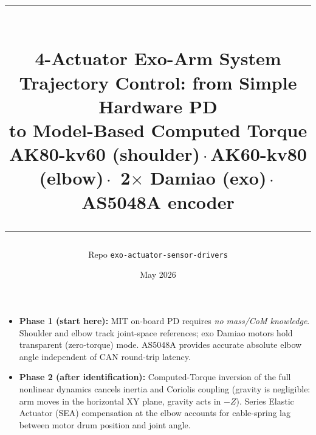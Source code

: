\documentclass[11pt,a4paper]{article}
\title{%
  \textcolor{hwblue}{\rule{\linewidth}{1.5pt}}\\[0.4cm]
  {\LARGE\bfseries 4-Actuator Exo-Arm System}\\[0.3cm]
  {\large Trajectory Control: from Simple Hardware PD\\to Model-Based Computed Torque}\\[0.2cm]
  {\normalsize AK80-kv60 (shoulder)\,$\cdot$\,AK60-kv80 (elbow)\,$\cdot$\,
   2$\times$ Damiao (exo)\,$\cdot$\,AS5048A encoder}\\[0.4cm]
  \textcolor{hwblue}{\rule{\linewidth}{1.5pt}}
}
\author{Repo \texttt{exo-actuator-sensor-drivers}}
\date{May 2026}
\begin{document}
\maketitle\thispagestyle{empty}

\begin{resultbox}
\begin{itemize}[leftmargin=1.5em]
  \item \textbf{Phase 1 (start here):} MIT on-board PD requires \emph{no mass/CoM knowledge}.
        Shoulder and elbow track joint-space references; exo Damiao motors hold
        transparent (zero-torque) mode.  AS5048A provides accurate absolute
        elbow angle independent of CAN round-trip latency.
  \item \textbf{Phase 2 (after identification):} Computed-Torque inversion of the
        full nonlinear dynamics cancels inertia and Coriolis coupling (gravity
        is negligible: arm moves in the horizontal XY plane, gravity acts in $-Z$).  Series
        Elastic Actuator (SEA) compensation at the elbow accounts for cable-spring
        lag between motor drum position and joint angle.
\end{itemize}
\end{resultbox}

\tableofcontents
\newpage
\end{document}
